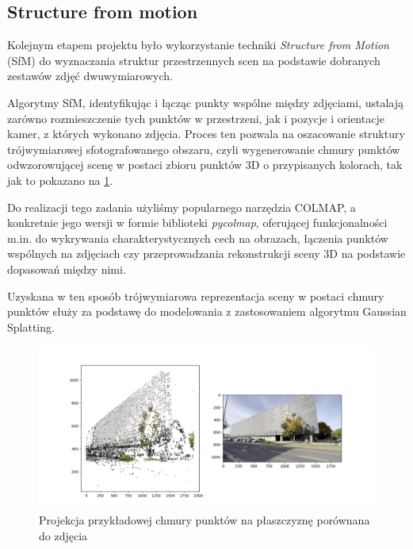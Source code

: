 \subsection{Structure from motion}
Kolejnym etapem projektu było wykorzystanie techniki \textit{Structure from Motion} (SfM) do wyznaczania
struktur przestrzennych scen na podstawie dobranych zestawów zdjęć dwuwymiarowych. 

Algorytmy SfM, identyfikując i łącząc 
punkty wspólne między zdjęciami, ustalają zarówno rozmieszczenie tych punktów w przestrzeni, jak i pozycje 
i orientacje kamer, z których wykonano zdjęcia. Proces ten pozwala na oszacowanie struktury trójwymiarowej
sfotografowanego obszaru, czyli wygenerowanie chmury punktów odwzorowującej scenę w postaci 
zbioru punktów 3D o przypisanych kolorach, tak jak to pokazano na \ref{fig:example_recon}. 

Do realizacji tego zadania użyliśmy popularnego narzędzia COLMAP, a konkretnie jego wersji w formie biblioteki 
\textit{pycolmap}, oferującej funkcjonalności m.in. do wykrywania charakterystycznych cech na obrazach, 
łączenia punktów wspólnych na zdjęciach czy przeprowadzania rekonstrukcji sceny 3D na podstawie dopasowań 
między nimi.

Uzyskana w ten sposób trójwymiarowa reprezentacja sceny w postaci chmury punktów służy za podstawę do 
modelowania z zastosowaniem algorytmu Gaussian Splatting. 

\begin{figure}[!ht]
    \centering
    \includegraphics[width=0.9\linewidth]{images/sfm.png}
    \caption{Projekcja przykładowej chmury punktów na płaszczyznę porównana do zdjęcia}
    \label{fig:example_recon}
\end{figure}